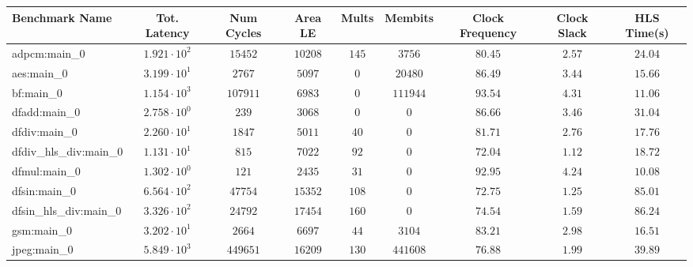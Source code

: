 \begin{tabular}{|l|c|c|c|c|c|c|c|c|}
\hline
Benchmark Name          & Tot. Latency           & Num Cycles & Area LE    & Mults   & Membits    & Clock Frequency & Clock Slack & HLS Time(s) \\
\hline
adpcm:main\_0           & $ 1.921 \cdot 10^{2} $ & $ 15452  $ & $ 10208  $ & $ 145 $ & $ 3756   $ & $ 80.45       $ & $ 2.57    $ & $ 24.04   $ \\
aes:main\_0             & $ 3.199 \cdot 10^{1} $ & $ 2767   $ & $ 5097   $ & $ 0   $ & $ 20480  $ & $ 86.49       $ & $ 3.44    $ & $ 15.66   $ \\
bf:main\_0              & $ 1.154 \cdot 10^{3} $ & $ 107911 $ & $ 6983   $ & $ 0   $ & $ 111944 $ & $ 93.54       $ & $ 4.31    $ & $ 11.06   $ \\
dfadd:main\_0           & $ 2.758 \cdot 10^{0} $ & $ 239    $ & $ 3068   $ & $ 0   $ & $ 0      $ & $ 86.66       $ & $ 3.46    $ & $ 31.04   $ \\
dfdiv:main\_0           & $ 2.260 \cdot 10^{1} $ & $ 1847   $ & $ 5011   $ & $ 40  $ & $ 0      $ & $ 81.71       $ & $ 2.76    $ & $ 17.76   $ \\
dfdiv\_hls\_div:main\_0 & $ 1.131 \cdot 10^{1} $ & $ 815    $ & $ 7022   $ & $ 92  $ & $ 0      $ & $ 72.04       $ & $ 1.12    $ & $ 18.72   $ \\
dfmul:main\_0           & $ 1.302 \cdot 10^{0} $ & $ 121    $ & $ 2435   $ & $ 31  $ & $ 0      $ & $ 92.95       $ & $ 4.24    $ & $ 10.08   $ \\
dfsin:main\_0           & $ 6.564 \cdot 10^{2} $ & $ 47754  $ & $ 15352  $ & $ 108 $ & $ 0      $ & $ 72.75       $ & $ 1.25    $ & $ 85.01   $ \\
dfsin\_hls\_div:main\_0 & $ 3.326 \cdot 10^{2} $ & $ 24792  $ & $ 17454  $ & $ 160 $ & $ 0      $ & $ 74.54       $ & $ 1.59    $ & $ 86.24   $ \\
gsm:main\_0             & $ 3.202 \cdot 10^{1} $ & $ 2664   $ & $ 6697   $ & $ 44  $ & $ 3104   $ & $ 83.21       $ & $ 2.98    $ & $ 16.51   $ \\
jpeg:main\_0            & $ 5.849 \cdot 10^{3} $ & $ 449651 $ & $ 16209  $ & $ 130 $ & $ 441608 $ & $ 76.88       $ & $ 1.99    $ & $ 39.89   $ \\

\end{tabular}
